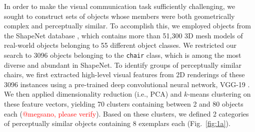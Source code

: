 \documentclass[10pt,letterpaper]{article}
\newcommand{\red}[1]{\textcolor{Red}{#1}}
\begin{document}
In order to make the visual communication task sufficiently challenging, we sought to construct sets of objects whose members were both geometrically complex and perceptually similar. 
To accomplish this, we employed objects from the ShapeNet database \cite{chang2015shapenet}, which contains more than 51,300 3D mesh models of real-world objects belonging to 55 different object classes.
We restricted our search to 3096 objects belonging to the \texttt{chair} class, which is among the most diverse and abundant in ShapeNet. 
To identify groups of perceptually similar chairs, we first extracted high-level visual features from 2D renderings of these 3096 instances using a pre-trained deep convolutional neural network, VGG-19 \cite{simonyan2014very}.   
We then applied dimensionality reduction (i.e., PCA) and $k$-means clustering on these feature vectors, yielding 70 clusters containing between 2 and 80 objects each (\red{@megsano, please verify}).
Based on these clusters, we defined 2 categories of perceptually similar objects containing 8 exemplars each (Fig.~\ref{fig:1a}). 
\end{document}
